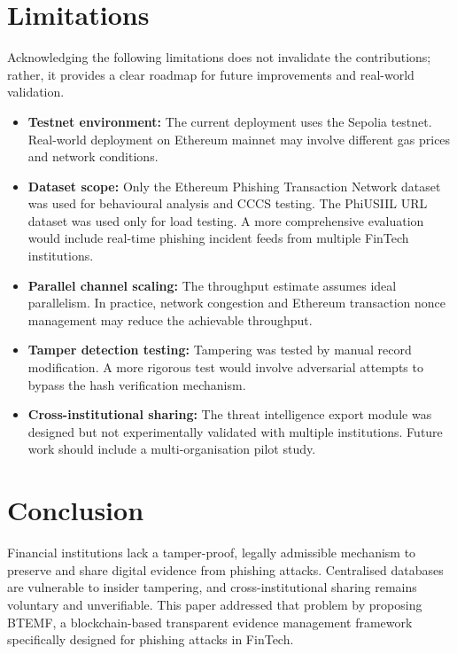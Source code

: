 \documentclass[conference]{IEEEtran}
\begin{document}
\section{Limitations}

Acknowledging the following limitations does not invalidate the contributions; rather, it provides a clear roadmap for future improvements and real-world validation.

\begin{itemize}
    \item \textbf{Testnet environment:} The current deployment uses the Sepolia testnet. Real-world deployment on Ethereum mainnet may involve different gas prices and network conditions.
    \item \textbf{Dataset scope:} Only the Ethereum Phishing Transaction Network dataset was used for behavioural analysis and CCCS testing. The PhiUSIIL URL dataset was used only for load testing. A more comprehensive evaluation would include real-time phishing incident feeds from multiple FinTech institutions.
    \item \textbf{Parallel channel scaling:} The throughput estimate assumes ideal parallelism. In practice, network congestion and Ethereum transaction nonce management may reduce the achievable throughput.
    \item \textbf{Tamper detection testing:} Tampering was tested by manual record modification. A more rigorous test would involve adversarial attempts to bypass the hash verification mechanism.
    \item \textbf{Cross-institutional sharing:} The threat intelligence export module was designed but not experimentally validated with multiple institutions. Future work should include a multi-organisation pilot study.
\end{itemize}

\section{Conclusion}
 
Financial institutions lack a tamper-proof, legally admissible mechanism to preserve and share digital evidence from phishing attacks. Centralised databases are vulnerable to insider tampering, and cross-institutional sharing remains voluntary and unverifiable. This paper addressed that problem by proposing BTEMF, a blockchain-based transparent evidence management framework specifically designed for phishing attacks in FinTech.
 
\end{document}
